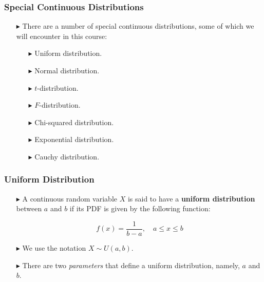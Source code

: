 \documentclass[12pt]{beamer}
\begin{document}
\begin{frame}
	\frametitle{Special Continuous Distributions}
	
	\begin{itemize}
		\item[\color{blue}$\blacktriangleright$] There are a number of special continuous distributions, some of which we will encounter in this course:
		\begin{itemize}
			\item[\color{blue}$\blacktriangleright$] Uniform distribution.
			\item[\color{blue}$\blacktriangleright$] Normal distribution.
			\item[\color{blue}$\blacktriangleright$] $t$-distribution.
			\item[\color{blue}$\blacktriangleright$] $F$-distribution.
			\item[\color{blue}$\blacktriangleright$] Chi-squared distribution.
			\item[\color{blue}$\blacktriangleright$] Exponential distribution.
			\item[\color{blue}$\blacktriangleright$] Cauchy distribution.
		\end{itemize}
	\end{itemize}
	
\end{frame}

\begin{frame}
	\frametitle{Uniform Distribution}
	
	\begin{itemize}
		\item[\color{blue}$\blacktriangleright$] A continuous random variable $X$ is said to have a \textbf{uniform distribution} between $a$ and $b$ if its PDF is given by the following function:
		
		\[f(x) = \frac{1}{b-a}, \quad a \leq x \leq b\]
		
		\item[\color{blue}$\blacktriangleright$] We use the notation $X \sim U(a,b)$.
		
		\item[\color{blue}$\blacktriangleright$] There are two \textit{parameters} that define a uniform distribution, namely, $a$ and $b$.
	\end{itemize}
	
\end{frame}
\end{document}
